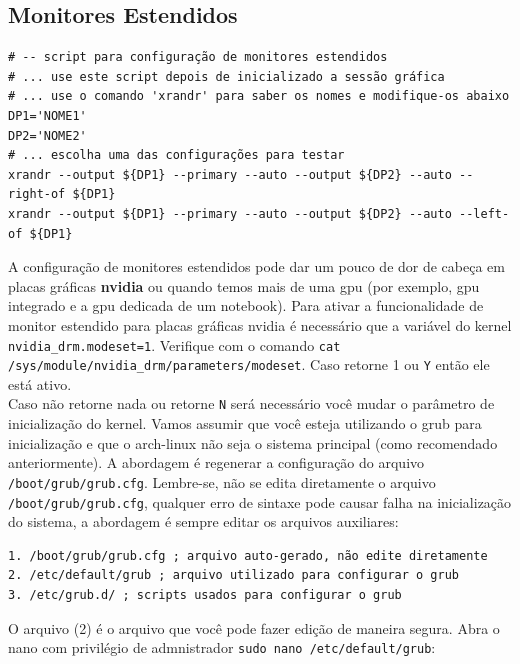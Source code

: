 \documentclass[12pt,a4paper]{article}
\begin{document}
\subsection{Monitores Estendidos}

\begin{lstlisting}
# -- script para configuração de monitores estendidos 
# ... use este script depois de inicializado a sessão gráfica
# ... use o comando 'xrandr' para saber os nomes e modifique-os abaixo
DP1='NOME1'
DP2='NOME2'
# ... escolha uma das configurações para testar
xrandr --output ${DP1} --primary --auto --output ${DP2} --auto --right-of ${DP1}
xrandr --output ${DP1} --primary --auto --output ${DP2} --auto --left-of ${DP1}
\end{lstlisting}

\vspace{\baselineskip}

A configuração de monitores estendidos pode dar um pouco de dor de cabeça em placas gráficas \textbf{nvidia} ou quando temos mais de uma gpu (por exemplo, gpu integrado e a gpu dedicada de um notebook). Para ativar a funcionalidade de monitor estendido para placas gráficas nvidia é necessário que a variável do kernel \texttt{nvidia\_drm.modeset=1}. Verifique com o comando \texttt{cat /sys/module/nvidia\_drm/parameters/modeset}. Caso retorne 1 ou \texttt{Y} então ele está ativo.\\

Caso não retorne nada ou retorne \texttt{N} será necessário você mudar o parâmetro de inicialização do kernel. Vamos assumir que você esteja utilizando o grub para inicialização e que o arch-linux não seja o sistema principal (como recomendado anteriormente). A abordagem é regenerar a configuração do arquivo \texttt{/boot/grub/grub.cfg}. Lembre-se, não se edita diretamente o arquivo \texttt{/boot/grub/grub.cfg}, qualquer erro de sintaxe pode causar falha na inicialização do sistema, a abordagem é sempre editar os arquivos auxiliares: \\

\begin{lstlisting}
1. /boot/grub/grub.cfg ; arquivo auto-gerado, não edite diretamente
2. /etc/default/grub ; arquivo utilizado para configurar o grub 
3. /etc/grub.d/ ; scripts usados para configurar o grub 
\end{lstlisting}

\vspace{\baselineskip}

O arquivo (2) é o arquivo que você pode fazer edição de maneira segura. Abra o nano com privilégio de admnistrador \texttt{sudo nano /etc/default/grub}:
\end{document}
